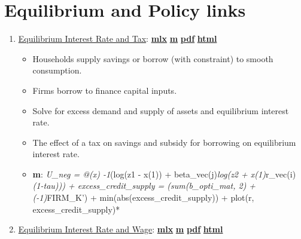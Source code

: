 \documentclass[
]{book}
\providecommand{\tightlist}{%
  \setlength{\itemsep}{0pt}\setlength{\parskip}{0pt}}
\begin{document}
\hypertarget{equilibrium-and-policy-links}{%
\section{Equilibrium and Policy links}\label{equilibrium-and-policy-links}}

\begin{enumerate}
\def\labelenumi{\arabic{enumi}.}
\tightlist
\item
  \href{https://fanwangecon.github.io/Math4Econ/equilibrium/htmlpdfm/equilibrium_constrainedborrow.html}{Equilibrium Interest Rate and Tax}: \href{https://github.com/FanWangEcon/Math4Econ/blob/master/equilibrium/equilibrium_constrainedborrow.mlx}{\textbf{mlx}} \textbar{} \href{https://github.com/FanWangEcon/Math4Econ/blob/master/equilibrium/htmlpdfm/equilibrium_constrainedborrow.m}{\textbf{m}} \textbar{} \href{https://github.com/FanWangEcon/Math4Econ/blob/master/equilibrium/htmlpdfm/equilibrium_constrainedborrow.pdf}{\textbf{pdf}} \textbar{} \href{https://fanwangecon.github.io/Math4Econ/equilibrium/htmlpdfm/equilibrium_constrainedborrow.html}{\textbf{html}}

  \begin{itemize}
  \tightlist
  \item
    Households supply savings or borrow (with constraint) to smooth consumption.
  \item
    Firms borrow to finance capital inputs.
  \item
    Solve for excess demand and supply of assets and equilibrium interest rate.
  \item
    The effect of a tax on savings and subsidy for borrowing on equilibrium interest rate.
  \item
    \textbf{m}: \emph{U\_neg = @(x) -1}(log(z1 - x(1)) + beta\_vec(j)\emph{log(z2 + x(1)}r\_vec(i)\emph{(1-tau))) + excess\_credit\_supply = (sum(b\_opti\_mat, 2) + (-1)}FIRM\_K') + min(abs(excess\_credit\_supply)) + plot(r, excess\_credit\_supply)*
  \end{itemize}
\item
  \href{https://fanwangecon.github.io/Math4Econ/equilibrium/htmlpdfm/equilibrium_constrainedborrow_labor.html}{Equilibrium Interest Rate and Wage}: \href{https://github.com/FanWangEcon/Math4Econ/blob/master/equilibrium/equilibrium_constrainedborrow_labor.mlx}{\textbf{mlx}} \textbar{} \href{https://github.com/FanWangEcon/Math4Econ/blob/master/equilibrium/htmlpdfm/equilibrium_constrainedborrow_labor.m}{\textbf{m}} \textbar{} \href{https://github.com/FanWangEcon/Math4Econ/blob/master/equilibrium/htmlpdfm/equilibrium_constrainedborrow_labor.pdf}{\textbf{pdf}} \textbar{} \href{https://fanwangecon.github.io/Math4Econ/equilibrium/htmlpdfm/equilibrium_constrainedborrow_labor.html}{\textbf{html}}


\end{enumerate}
\end{document}
